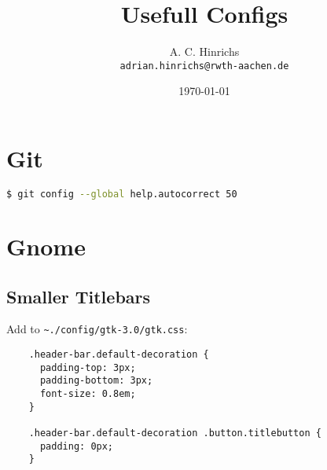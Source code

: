 \documentclass[10pt,landscape,a4paper]{cheatsheet}
\title{Usefull Configs}
\author{A. C. Hinrichs\\\texttt{adrian.hinrichs@rwth-aachen.de}}
\date{\today}
\begin{document}
  \maketitle
  \section{Git}
  \begin{lstlisting}[language=bash]
    $ git config --global help.autocorrect 50
  \end{lstlisting}%

  \section{Gnome}
  \subsection{Smaller Titlebars}
  Add to \lstinline{~./config/gtk-3.0/gtk.css}:
  \begin{lstlisting}
    .header-bar.default-decoration {
      padding-top: 3px;
      padding-bottom: 3px;
      font-size: 0.8em;
    }
    
    .header-bar.default-decoration .button.titlebutton {
      padding: 0px;
    }
  \end{lstlisting}
\end{document}
